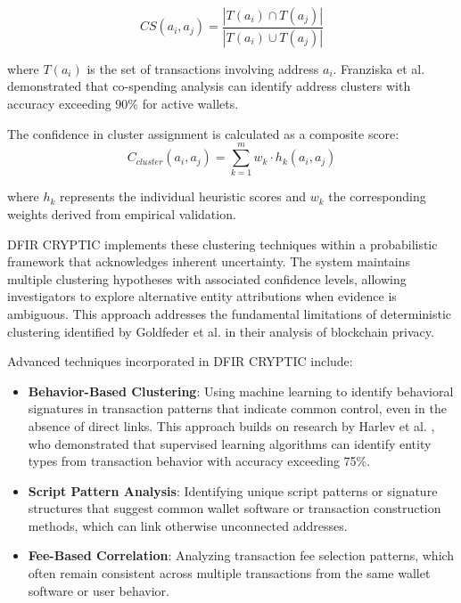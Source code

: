 \documentclass[conference]{IEEEtran}
\begin{document}
\begin{itemize}
    \begin{equation}
    CS(a_i, a_j) = \frac{|T(a_i) \cap T(a_j)|}{|T(a_i) \cup T(a_j)|}
    \end{equation}
    
    where $T(a_i)$ is the set of transactions involving address $a_i$. Franziska et al. \cite{franziska2018} demonstrated that co-spending analysis can identify address clusters with accuracy exceeding 90\% for active wallets.
\end{itemize}

The confidence in cluster assignment is calculated as a composite score:
\begin{equation}
C_{cluster}(a_i, a_j) = \sum_{k=1}^{m} w_k \cdot h_k(a_i, a_j)
\end{equation}

where $h_k$ represents the individual heuristic scores and $w_k$ the corresponding weights derived from empirical validation.

DFIR CRYPTIC implements these clustering techniques within a probabilistic framework that acknowledges inherent uncertainty. The system maintains multiple clustering hypotheses with associated confidence levels, allowing investigators to explore alternative entity attributions when evidence is ambiguous. This approach addresses the fundamental limitations of deterministic clustering identified by Goldfeder et al. in their analysis of blockchain privacy.

Advanced techniques incorporated in DFIR CRYPTIC include:

\begin{itemize}
    \item \textbf{Behavior-Based Clustering}: Using machine learning to identify behavioral signatures in transaction patterns that indicate common control, even in the absence of direct links. This approach builds on research by Harlev et al. \cite{harlev2018}, who demonstrated that supervised learning algorithms can identify entity types from transaction behavior with accuracy exceeding 75\%.
    
    \item \textbf{Script Pattern Analysis}: Identifying unique script patterns or signature structures that suggest common wallet software or transaction construction methods, which can link otherwise unconnected addresses.
    
    \item \textbf{Fee-Based Correlation}: Analyzing transaction fee selection patterns, which often remain consistent across multiple transactions from the same wallet software or user behavior.
\end{itemize}
\end{document}
